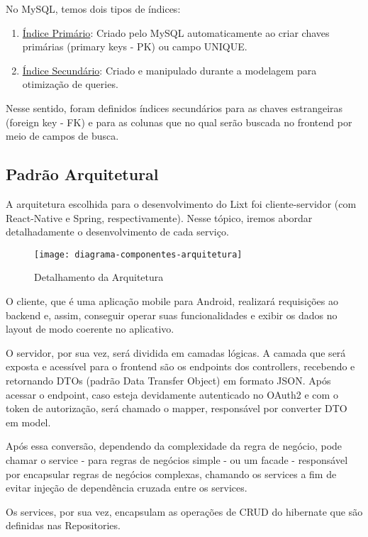 No MySQL, temos dois tipos de índices:

\begin{enumerate}
	\item \underline{Índice Primário}: Criado pelo MySQL automaticamente ao criar chaves primárias (primary keys - PK) ou campo UNIQUE.
	\item \underline{Índice Secundário}: Criado e manipulado durante a modelagem para otimização de queries.
\end{enumerate}	

Nesse sentido, foram definidos índices secundários para as chaves estrangeiras (foreign key - FK) e para as colunas que no qual serão buscada no frontend por meio de campos de busca.

\subsection{Padrão Arquitetural}

A arquitetura escolhida para o desenvolvimento do Lixt foi cliente-servidor (com React-Native e Spring, respectivamente). Nesse tópico, iremos abordar detalhadamente o desenvolvimento de cada serviço.

\begin{figure}[H]
  \centering
  \caption{Detalhamento da Arquitetura}
  \label{fig:diagrama-componentes-arquitetura}
  \texttt{[image: diagrama-componentes-arquitetura]}
\end{figure}

O cliente, que é uma aplicação mobile para Android, realizará requisições ao backend e, assim, conseguir operar suas funcionalidades e exibir os dados no layout de modo coerente no aplicativo.

O servidor, por sua vez, será dividida em camadas lógicas. A camada que será exposta e acessível para o frontend são os endpoints dos controllers, recebendo e retornando DTOs (padrão Data Transfer Object) em formato JSON. Após acessar o endpoint, caso esteja devidamente autenticado no OAuth2 e com o token de autorização, será chamado o mapper, responsável por converter DTO em model.

Após essa conversão, dependendo da complexidade da regra de negócio, pode chamar o service - para regras de negócios simple -  ou um facade - responsável por encapsular regras de negócios complexas, chamando os services a fim de evitar injeção de dependência cruzada entre os services. 

Os services, por sua vez, encapsulam as operações de CRUD do hibernate que são definidas nas Repositories.

